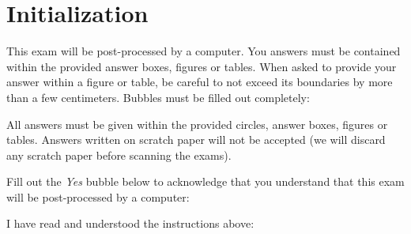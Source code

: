 \documentclass[11pt]{article}
\begin{document}
\cfoot{}

\pagestyle{empty}

\maketitle

\newpage

\pagestyle{fancy}

\section*{Initialization}

This exam will be post-processed by a computer. You answers must be contained
within the provided answer boxes, figures or tables. When asked to provide
your answer within a figure or table, be careful to not exceed its boundaries
by more than a few centimeters. Bubbles must be filled out completely:

\begin{center}
 
\end{center}

All answers must be given within the provided circles, answer boxes, figures
or tables. Answers written on scratch paper will not be accepted (we will
discard any scratch paper before scanning the exams).

\begin{question}{2} Fill out the \textit{Yes} bubble below to acknowledge that
    you understand that this exam will be post-processed by a computer:

\begin{center}
I have read and understood the instructions above: \yesnoyes
\end{center}

\end{question}

\newpage


\end{document}
